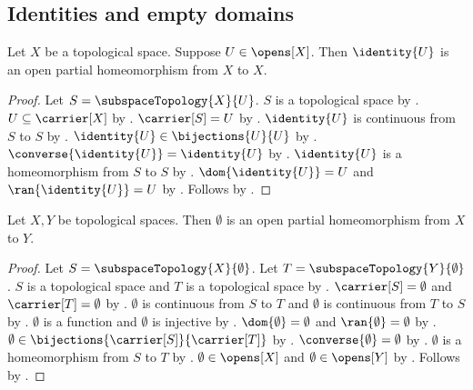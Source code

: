 \subsection{Identities and empty domains}

\begin{theorem}\label{identity_open_partial_homeomorphism}
    Let $X$ be a topological space.
    Suppose $U\in\opens[X]$.
    Then $\identity{U}$ is an open partial homeomorphism from $X$ to $X$.
\end{theorem}
\begin{proof}
    Let $S=\subspaceTopology{X}{U}$.
    $S$ is a topological space by
        .
    $U\subseteq\carrier[X]$ by .
    $\carrier[S]=U$ by .
    $\identity{U}$ is continuous from $S$ to $S$ by
        .
    $\identity{U}\in\bijections{U}{U}$ by .
    $\converse{\identity{U}}=\identity{U}$ by .
    $\identity{U}$ is a homeomorphism from $S$ to $S$ by .
    $\dom{\identity{U}}=U$ and $\ran{\identity{U}}=U$ by .
    Follows by .
\end{proof}

\begin{theorem}\label{empty_open_partial_homeomorphism}
    Let $X,Y$ be topological spaces.
    Then $\emptyset$ is an open partial homeomorphism from $X$ to $Y$.
\end{theorem}
\begin{proof}
    Let $S=\subspaceTopology{X}{\emptyset}$.
    Let $T=\subspaceTopology{Y}{\emptyset}$.
    $S$ is a topological space and $T$ is a topological space by
        .
    $\carrier[S]=\emptyset$ and $\carrier[T]=\emptyset$ by
        .
    $\emptyset$ is continuous from $S$ to $T$ and
        $\emptyset$ is continuous from $T$ to $S$ by
        .
    $\emptyset$ is a function and $\emptyset$ is injective by
        .
    $\dom{\emptyset}=\emptyset$ and $\ran{\emptyset}=\emptyset$ by
        .
    $\emptyset\in\bijections{\carrier[S]}{\carrier[T]}$ by
        .
    $\converse{\emptyset}=\emptyset$ by .
    $\emptyset$ is a homeomorphism from $S$ to $T$ by .
    $\emptyset\in\opens[X]$ and $\emptyset\in\opens[Y]$ by
        .
    Follows by .
\end{proof}

